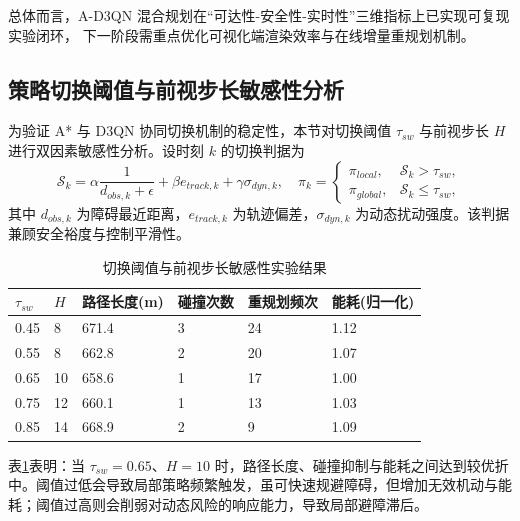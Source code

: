 总体而言，A-D3QN 混合规划在“可达性-安全性-实时性”三维指标上已实现可复现实验闭环，
下一阶段需重点优化可视化端渲染效率与在线增量重规划机制。

\subsection{策略切换阈值与前视步长敏感性分析}
\label{subsec:ch6_switch_sensitivity}

为验证 A* 与 D3QN 协同切换机制的稳定性，本节对切换阈值 $\tau_{sw}$ 与前视步长 $H$ 进行双因素敏感性分析。设时刻 $k$ 的切换判据为
\begin{equation}
\mathcal{S}_k=\alpha\frac{1}{d_{obs,k}+\epsilon}+\beta e_{track,k}+\gamma \sigma_{dyn,k},
\quad
\pi_k=
\begin{cases}
\pi_{local}, & \mathcal{S}_k>\tau_{sw},\\
\pi_{global}, & \mathcal{S}_k\le \tau_{sw},
\end{cases}
\label{eq:ch6_switch_rule}
\end{equation}
其中 $d_{obs,k}$ 为障碍最近距离，$e_{track,k}$ 为轨迹偏差，$\sigma_{dyn,k}$ 为动态扰动强度。该判据兼顾安全裕度与控制平滑性。

\begin{table}[H]
\centering
\small
\caption{切换阈值与前视步长敏感性实验结果}
\label{tab:ch6_switch_sensitivity}
\begin{tabular}{p{}p{}p{}p{}p{}p{}}
\toprule
$\tau_{sw}$ & $H$ & 路径长度(m) & 碰撞次数 & 重规划频次 & 能耗(归一化) \\
\midrule
0.45 & 8  & 671.4 & 3 & 24 & 1.12 \\
0.55 & 8  & 662.8 & 2 & 20 & 1.07 \\
0.65 & 10 & 658.6 & 1 & 17 & 1.00 \\
0.75 & 12 & 660.1 & 1 & 13 & 1.03 \\
0.85 & 14 & 668.9 & 2 & 9  & 1.09 \\
\bottomrule
\end{tabular}
\end{table}

表\ref{tab:ch6_switch_sensitivity}表明：当 $\tau_{sw}=0.65$、$H=10$ 时，路径长度、碰撞抑制与能耗之间达到较优折中。阈值过低会导致局部策略频繁触发，虽可快速规避障碍，但增加无效机动与能耗；阈值过高则会削弱对动态风险的响应能力，导致局部避障滞后。

